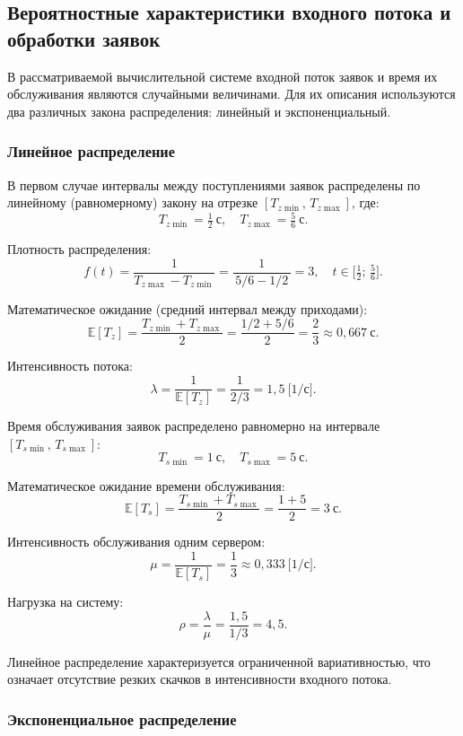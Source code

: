 \documentclass[14pt,a4paper]{extarticle}
\begin{document}
\subsection{Вероятностные характеристики входного потока и обработки заявок}

В рассматриваемой вычислительной системе входной поток заявок и время их
обслуживания являются случайными величинами. Для их описания используются два
различных закона распределения: линейный и экспоненциальный.

\subsubsection*{Линейное распределение}

В первом случае интервалы между поступлениями заявок распределены по линейному
(равномерному) закону на отрезке $[T_{z\min},\, T_{z\max}]$, где:
\[
  T_{z\min} = \tfrac{1}{2}\ \text{с}, \quad T_{z\max} = \tfrac{5}{6}\ \text{с}.
\]

Плотность распределения:
\[
  f(t) = \frac{1}{T_{z\max} - T_{z\min}} = \frac{1}{\,5/6 - 1/2\,} = 3,
  \quad t \in \bigl[\tfrac{1}{2};\, \tfrac{5}{6}\bigr].
\]

Математическое ожидание (средний интервал между приходами):
\[
  \mathbb{E}[T_z] = \frac{T_{z\min} + T_{z\max}}{2}
  = \frac{1/2 + 5/6}{2} = \frac{2}{3} \approx 0{,}667\ \text{с}.
\]

Интенсивность потока:
\[
  \lambda = \frac{1}{\mathbb{E}[T_z]} = \frac{1}{2/3} = 1{,}5\ \text{[1/с]}.
\]

Время обслуживания заявок распределено равномерно на интервале
$[T_{s\min},\, T_{s\max}]$:
\[
  T_{s\min} = 1\ \text{с}, \quad T_{s\max} = 5\ \text{с}.
\]

Математическое ожидание времени обслуживания:
\[
  \mathbb{E}[T_s] = \frac{T_{s\min} + T_{s\max}}{2} = \frac{1 + 5}{2} = 3\ \text{с}.
\]

Интенсивность обслуживания одним сервером:
\[
  \mu = \frac{1}{\mathbb{E}[T_s]} = \frac{1}{3} \approx 0{,}333\ \text{[1/с]}.
\]

Нагрузка на систему:
\[
  \rho = \frac{\lambda}{\mu} = \frac{1{,}5}{1/3} = 4{,}5.
\]

Линейное распределение характеризуется ограниченной вариативностью, что означает
отсутствие резких скачков в интенсивности входного потока.

\subsubsection*{Экспоненциальное распределение}
\end{document}
